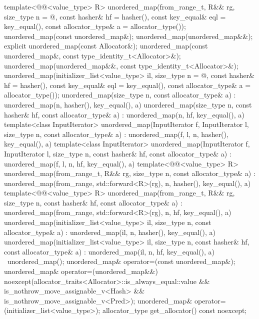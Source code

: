 \begin{codeblock}
{{    template<@@<value_type> R>
      unordered_map(from_range_t, R&& rg, size_type n = @\seebelow@,
        const hasher& hf = hasher(), const key_equal& eql = key_equal(),
        const allocator_type& a = allocator_type());
    unordered_map(const unordered_map&);
    unordered_map(unordered_map&&);
    explicit unordered_map(const Allocator&);
    unordered_map(const unordered_map&, const type_identity_t<Allocator>&);
    unordered_map(unordered_map&&, const type_identity_t<Allocator>&);
    unordered_map(initializer_list<value_type> il,
                  size_type n = @\seebelow@,
                  const hasher& hf = hasher(),
                  const key_equal& eql = key_equal(),
                  const allocator_type& a = allocator_type());
    unordered_map(size_type n, const allocator_type& a)
      : unordered_map(n, hasher(), key_equal(), a) { }
    unordered_map(size_type n, const hasher& hf, const allocator_type& a)
      : unordered_map(n, hf, key_equal(), a) { }
    template<class InputIterator>
      unordered_map(InputIterator f, InputIterator l, size_type n, const allocator_type& a)
        : unordered_map(f, l, n, hasher(), key_equal(), a) { }
    template<class InputIterator>
      unordered_map(InputIterator f, InputIterator l, size_type n, const hasher& hf,
                    const allocator_type& a)
        : unordered_map(f, l, n, hf, key_equal(), a) { }
    template<@@<value_type> R>
      unordered_map(from_range_t, R&& rg, size_type n, const allocator_type& a)
        : unordered_map(from_range, std::forward<R>(rg), n, hasher(), key_equal(), a) { }
    template<@@<value_type> R>
      unordered_map(from_range_t, R&& rg, size_type n, const hasher& hf, const allocator_type& a)
        : unordered_map(from_range, std::forward<R>(rg), n, hf, key_equal(), a) { }
    unordered_map(initializer_list<value_type> il, size_type n, const allocator_type& a)
      : unordered_map(il, n, hasher(), key_equal(), a) { }
    unordered_map(initializer_list<value_type> il, size_type n, const hasher& hf,
                  const allocator_type& a)
      : unordered_map(il, n, hf, key_equal(), a) { }
    ~unordered_map();
    unordered_map& operator=(const unordered_map&);
    unordered_map& operator=(unordered_map&&)
      noexcept(allocator_traits<Allocator>::is_always_equal::value &&
               is_nothrow_move_assignable_v<Hash> &&
               is_nothrow_move_assignable_v<Pred>);
    unordered_map& operator=(initializer_list<value_type>);
    allocator_type get_allocator() const noexcept;

}}
\end{codeblock}
